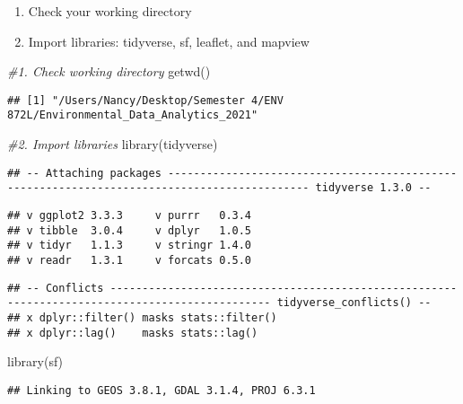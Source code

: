 \documentclass[
]{article}
\newenvironment{Shaded}{\begin{snugshade}}{\end{snugshade}}
\newcommand{\CommentTok}[1]{\textcolor[rgb]{0.56,0.35,0.01}{\textit{#1}}}
\newcommand{\FunctionTok}[1]{\textcolor[rgb]{0.00,0.00,0.00}{#1}}
\newcommand{\NormalTok}[1]{#1}
\providecommand{\tightlist}{%
  \setlength{\itemsep}{0pt}\setlength{\parskip}{0pt}}
\begin{document}
\begin{enumerate}
\def\labelenumi{\arabic{enumi}.}
\tightlist
\item
  Check your working directory
\item
  Import libraries: tidyverse, sf, leaflet, and mapview
\end{enumerate}

\begin{Shaded}
\begin{Highlighting}[]
\CommentTok{\#1. Check working directory}
\FunctionTok{getwd}\NormalTok{()}
\end{Highlighting}
\end{Shaded}

\begin{verbatim}
## [1] "/Users/Nancy/Desktop/Semester 4/ENV 872L/Environmental_Data_Analytics_2021"
\end{verbatim}

\begin{Shaded}
\begin{Highlighting}[]
\CommentTok{\#2. Import libraries}
\FunctionTok{library}\NormalTok{(tidyverse)}
\end{Highlighting}
\end{Shaded}

\begin{verbatim}
## -- Attaching packages -------------------------------------------------------------------------------------------- tidyverse 1.3.0 --
\end{verbatim}

\begin{verbatim}
## v ggplot2 3.3.3     v purrr   0.3.4
## v tibble  3.0.4     v dplyr   1.0.5
## v tidyr   1.1.3     v stringr 1.4.0
## v readr   1.3.1     v forcats 0.5.0
\end{verbatim}

\begin{verbatim}
## -- Conflicts ----------------------------------------------------------------------------------------------- tidyverse_conflicts() --
## x dplyr::filter() masks stats::filter()
## x dplyr::lag()    masks stats::lag()
\end{verbatim}

\begin{Shaded}
\begin{Highlighting}[]
\FunctionTok{library}\NormalTok{(sf)}
\end{Highlighting}
\end{Shaded}

\begin{verbatim}
## Linking to GEOS 3.8.1, GDAL 3.1.4, PROJ 6.3.1
\end{verbatim}
\end{document}
